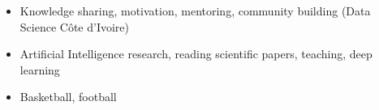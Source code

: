\documentclass[11pt,a4paper,ragged2e, withhyper]{altacv}
\begin{document}
%

\smallskip
\begin{itemize}
      \item Knowledge sharing, motivation, mentoring, community building (Data Science Côte d'Ivoire)
      \item Artificial Intelligence research, reading scientific papers, teaching, deep learning
      \item Basketball, football
\end{itemize}





\clearpage
\end{document}
